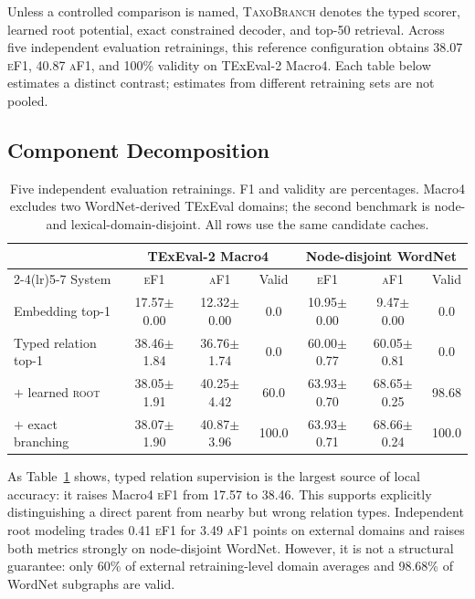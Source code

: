 \documentclass[11pt]{article}
\newcommand{\rootnode}{\textsc{root}}
\newcommand{\method}{\textsc{TaxoBranch}}
\newcommand{\ef}{\textsc{eF1}}
\newcommand{\af}{\textsc{aF1}}
\begin{document}
Unless a controlled comparison is named, \method{} denotes the typed scorer,
learned root potential, exact constrained decoder, and top-50 retrieval. Across
five independent evaluation retrainings, this reference configuration obtains
38.07 \ef{}, 40.87 \af{}, and 100\% validity on TExEval-2 Macro4. Each table
below estimates a distinct contrast; estimates from different retraining sets
are not pooled.

\subsection{Component Decomposition}


\begin{table}[t]
\centering
\small
\begin{tabular}{lcccccc}
\toprule
& \multicolumn{3}{c}{TExEval-2 Macro4} & \multicolumn{3}{c}{Node-disjoint WordNet}\\
\cmidrule(lr){2-4}\cmidrule(lr){5-7}
System & \ef & \af & Valid & \ef & \af & Valid\\
\midrule
Embedding top-1 & 17.57$\pm$0.00 & 12.32$\pm$0.00 & 0.0 & 10.95$\pm$0.00 & 9.47$\pm$0.00 & 0.0\\
Typed relation top-1 & 38.46$\pm$1.84 & 36.76$\pm$1.74 & 0.0 & 60.00$\pm$0.77 & 60.05$\pm$0.81 & 0.0\\
$+$ learned \rootnode{} & 38.05$\pm$1.91 & 40.25$\pm$4.42 & 60.0 & 63.93$\pm$0.70 & 68.65$\pm$0.25 & 98.68\\
$+$ exact branching & 38.07$\pm$1.90 & 40.87$\pm$3.96 & 100.0 & 63.93$\pm$0.71 & 68.66$\pm$0.24 & 100.0\\
\bottomrule
\end{tabular}
\caption{Five independent evaluation retrainings. F1 and validity are percentages. Macro4
excludes two WordNet-derived TExEval domains; the second benchmark is node- and
lexical-domain-disjoint. All rows use the same candidate caches.}
\label{tab:main}
\end{table}

As Table~\ref{tab:main} shows, typed relation supervision is the largest source
of local accuracy: it raises
Macro4 \ef{} from 17.57 to 38.46.  This supports explicitly distinguishing a
direct parent from nearby but wrong relation types.  Independent root modeling
trades 0.41 \ef{} for 3.49 \af{} points on external domains and raises both
metrics strongly on node-disjoint WordNet.  However, it is not a structural
guarantee: only 60\% of external retraining-level domain averages and 98.68\% of
WordNet subgraphs are valid.
\end{document}
